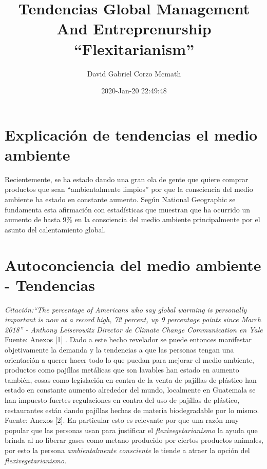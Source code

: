 \documentclass{article}
\title{Tendencias Global Management And Entreprenurship \\ \Huge{``Flexitarianism''}}
\author{David Gabriel Corzo Mcmath}
\date{2020-Jan-20 22:49:48}
\begin{document}
\maketitle

\section{Explicación de tendencias el medio ambiente}
Recientemente, se ha estado dando una gran ola de gente que quiere comprar productos que sean ``ambientalmente limpios'' por que la consciencia del medio ambiente ha estado en constante aumento. Según National Geographic se fundamenta esta afirmación con estadísticas que muestran que ha ocurrido un aumento de hasta 9\% en la consciencia del medio ambiente principalmente por el asunto del calentamiento global.

\section{Autoconciencia del medio ambiente - Tendencias }
\emph{Citación:``The percentage of Americans who say global warming is personally important is now at a record high, 72 percent, up 9 percentage points since March 2018'' - Anthony Leiserowitz Director de Climate Change Communication en Yale} Fuente: Anexos [1] . Dado a este hecho revelador se puede entonces manifestar objetivamente la demanda y la tendencias a que las personas tengan una orientación a querer hacer todo lo que puedan para mejorar el medio ambiente, productos como pajíllas metálicas que son lavables han estado en aumento también, cosas como legislación en contra de la venta de pajíllas de plástico han estado en constante aumento alrededor del mundo, localmente en Guatemala se han impuesto fuertes regulaciones en contra del uso de pajíllas de plástico, restaurantes están dando pajíllas hechas de materia biodegradable por lo mismo. Fuente: Anexos [2]. En particular esto es relevante por que una razón muy popular que las personas usan para justificar el \emph{flexivegetarianismo} la ayuda que brinda al no liberar gases como metano producido por ciertos productos animales, por esto la persona \emph{ambientalmente consciente} le tiende a atraer la opción del \emph{flexivegetarianismo}. 

\end{document}
